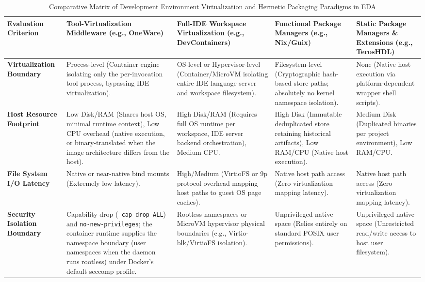 \begin{table}[htbp]
\centering
\caption{Comparative Matrix of Development Environment Virtualization and Hermetic Packaging Paradigms in EDA}
\label{tab:virtualization_matrix}
\footnotesize
\setlength{\tabcolsep}{3pt}
\begin{tabularx}{\textwidth}{@{} >{\hsize=1.2\hsize\raggedright\arraybackslash}X >{\hsize=0.95\hsize\raggedright\arraybackslash}X >{\hsize=0.95\hsize\raggedright\arraybackslash}X >{\hsize=0.95\hsize\raggedright\arraybackslash}X >{\hsize=0.95\hsize\raggedright\arraybackslash}X @{}}
\textbf{Evaluation Criterion} & 
\textbf{Tool-Virtualization Middleware (e.g., OneWare)} & 
\textbf{Full-IDE Workspace Virtualization (e.g., DevContainers)} & 
\textbf{Functional Package Managers (e.g., Nix/Guix)} & 
\textbf{Static Package Managers \& Extensions (e.g., TerosHDL)} \\
\midrule
\textbf{Virtualization Boundary} & Process-level (Container engine isolating only the per-invocation tool process, bypassing IDE virtualization). & OS-level or Hypervisor-level (Container/MicroVM isolating entire IDE language server and workspace filesystem). & Filesystem-level (Cryptographic hash-based store paths; absolutely no kernel namespace isolation). & None (Native host execution via platform-dependent wrapper shell scripts). \\
\addlinespace
\textbf{Host Resource Footprint} & Low Disk/RAM (Shares host OS, minimal runtime context), Low CPU overhead (native execution, or binary-translated when the image architecture differs from the host). & High Disk/RAM (Requires full OS runtime per workspace, IDE server backend orchestration), Medium CPU. & High Disk (Immutable deduplicated store retaining historical artifacts), Low RAM/CPU (Native host execution). & Medium Disk (Duplicated binaries per project environment), Low RAM/CPU. \\
\addlinespace
\textbf{File System I/O Latency} & Native or near-native bind mounts (Extremely low latency). & High/Medium (VirtioFS or 9p protocol overhead mapping host paths to guest OS page caches). & Native host path access (Zero virtualization mapping latency). & Native host path access (Zero virtualization mapping latency). \\
\addlinespace
\textbf{Security Isolation Boundary} & Capability drop (\texttt{--cap-drop ALL}) and \texttt{no-new-privileges}; the container runtime supplies the namespace boundary (user namespaces when the daemon runs rootless) under Docker's default seccomp profile. & Rootless namespaces or MicroVM hypervisor physical boundaries (e.g., Virtio-blk/VirtioFS isolation). & Unprivileged native space (Relies entirely on standard POSIX user permissions). & Unprivileged native space (Unrestricted read/write access to host user filesystem). \\

\end{tabularx}
\end{table}
